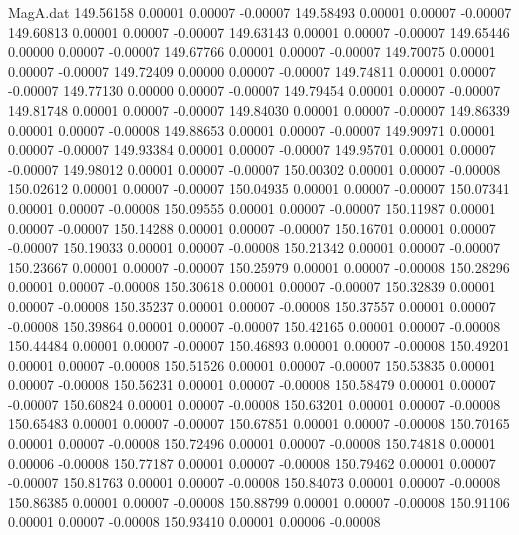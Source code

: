 \begin{filecontents}{MagA.dat}
 149.56158    0.00001    0.00007   -0.00007
 149.58493    0.00001    0.00007   -0.00007
 149.60813    0.00001    0.00007   -0.00007
 149.63143    0.00001    0.00007   -0.00007
 149.65446    0.00000    0.00007   -0.00007
 149.67766    0.00001    0.00007   -0.00007
 149.70075    0.00001    0.00007   -0.00007
 149.72409    0.00000    0.00007   -0.00007
 149.74811    0.00001    0.00007   -0.00007
 149.77130    0.00000    0.00007   -0.00007
 149.79454    0.00001    0.00007   -0.00007
 149.81748    0.00001    0.00007   -0.00007
 149.84030    0.00001    0.00007   -0.00007
 149.86339    0.00001    0.00007   -0.00008
 149.88653    0.00001    0.00007   -0.00007
 149.90971    0.00001    0.00007   -0.00007
 149.93384    0.00001    0.00007   -0.00007
 149.95701    0.00001    0.00007   -0.00007
 149.98012    0.00001    0.00007   -0.00007
 150.00302    0.00001    0.00007   -0.00008
 150.02612    0.00001    0.00007   -0.00007
 150.04935    0.00001    0.00007   -0.00007
 150.07341    0.00001    0.00007   -0.00008
 150.09555    0.00001    0.00007   -0.00007
 150.11987    0.00001    0.00007   -0.00007
 150.14288    0.00001    0.00007   -0.00007
 150.16701    0.00001    0.00007   -0.00007
 150.19033    0.00001    0.00007   -0.00008
 150.21342    0.00001    0.00007   -0.00007
 150.23667    0.00001    0.00007   -0.00007
 150.25979    0.00001    0.00007   -0.00008
 150.28296    0.00001    0.00007   -0.00008
 150.30618    0.00001    0.00007   -0.00007
 150.32839    0.00001    0.00007   -0.00008
 150.35237    0.00001    0.00007   -0.00008
 150.37557    0.00001    0.00007   -0.00008
 150.39864    0.00001    0.00007   -0.00007
 150.42165    0.00001    0.00007   -0.00008
 150.44484    0.00001    0.00007   -0.00007
 150.46893    0.00001    0.00007   -0.00008
 150.49201    0.00001    0.00007   -0.00008
 150.51526    0.00001    0.00007   -0.00007
 150.53835    0.00001    0.00007   -0.00008
 150.56231    0.00001    0.00007   -0.00008
 150.58479    0.00001    0.00007   -0.00007
 150.60824    0.00001    0.00007   -0.00008
 150.63201    0.00001    0.00007   -0.00008
 150.65483    0.00001    0.00007   -0.00007
 150.67851    0.00001    0.00007   -0.00008
 150.70165    0.00001    0.00007   -0.00008
 150.72496    0.00001    0.00007   -0.00008
 150.74818    0.00001    0.00006   -0.00008
 150.77187    0.00001    0.00007   -0.00008
 150.79462    0.00001    0.00007   -0.00007
 150.81763    0.00001    0.00007   -0.00008
 150.84073    0.00001    0.00007   -0.00008
 150.86385    0.00001    0.00007   -0.00008
 150.88799    0.00001    0.00007   -0.00008
 150.91106    0.00001    0.00007   -0.00008
 150.93410    0.00001    0.00006   -0.00008

\end{filecontents}
